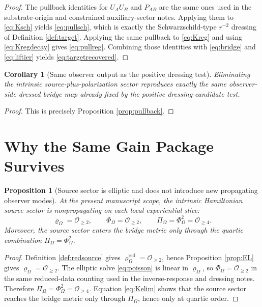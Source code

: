 \documentclass[11pt]{article}
\newcommand{\ProjSub}{P}
\newcommand{\FlowPot}{\Phi_\Omega}
\newcommand{\BalanceField}{\Pi_\Omega}
\newcommand{\SourceDensity}{\varrho_\Omega}
\newcommand{\SourceDensityRed}{\varrho_\Omega^{\mathrm{red}}}
\newtheorem{proposition}{Proposition}
\newtheorem{corollary}{Corollary}
\begin{document}
\begin{proof}
The pullback identities for \(U_AU_B\) and \(\ProjSub_{AB}\) are the same ones used in the substrate-origin and constrained auxiliary-sector notes. Applying them to \eqref{eq:Ksch} yields \eqref{eq:pullsch}, which is exactly the Schwarzschild-type \(r^{-2}\) dressing of Definition \ref{def:target}. Applying the same pullback to \eqref{eq:Kreg} and using \eqref{eq:Kregdecay} gives \eqref{eq:pullreg}. Combining those identities with \eqref{eq:bridge} and \eqref{eq:liftier} yields \eqref{eq:targetrecovered}.
\end{proof}

\begin{corollary}[Same observer output as the positive dressing test]
\label{cor:sameoutput}
Eliminating the intrinsic source-plus-polarization sector reproduces exactly the same observer-side dressed bridge map already fixed by the positive dressing-candidate test.
\end{corollary}

\begin{proof}
This is precisely Proposition \ref{prop:pullback}.
\end{proof}

\section{Why the Same Gain Package Survives}

\begin{proposition}[Source sector is elliptic and does not introduce new propagating observer modes]
\label{prop:elliptic}
At the present manuscript scope, the intrinsic Hamiltonian source sector is nonpropagating on each local experiential slice:
\begin{equation}
\SourceDensity=\mathcal O_{\ge 2},
\qquad
\FlowPot=\mathcal O_{\ge 2},
\qquad
\BalanceField=\FlowPot^2=\mathcal O_{\ge 4}.
\label{eq:orders}
\end{equation}
Moreover, the source sector enters the bridge metric only through the quartic combination \(\BalanceField=\FlowPot^2\).
\end{proposition}

\begin{proof}
Definition \ref{def:redsource} gives \(\SourceDensityRed=\mathcal O_{\ge 2}\), hence Proposition \ref{prop:EL} gives \(\SourceDensity=\mathcal O_{\ge 2}\). The elliptic solve \eqref{eq:poisson} is linear in \(\SourceDensity\), so \(\FlowPot=\mathcal O_{\ge 2}\) in the same reduced-data counting used in the inverse-response and dressing notes. Therefore \(\BalanceField=\FlowPot^2=\mathcal O_{\ge 4}\). Equation \eqref{eq:Kelim} shows that the source sector reaches the bridge metric only through \(\BalanceField\), hence only at quartic order.
\end{proof}
\end{document}
